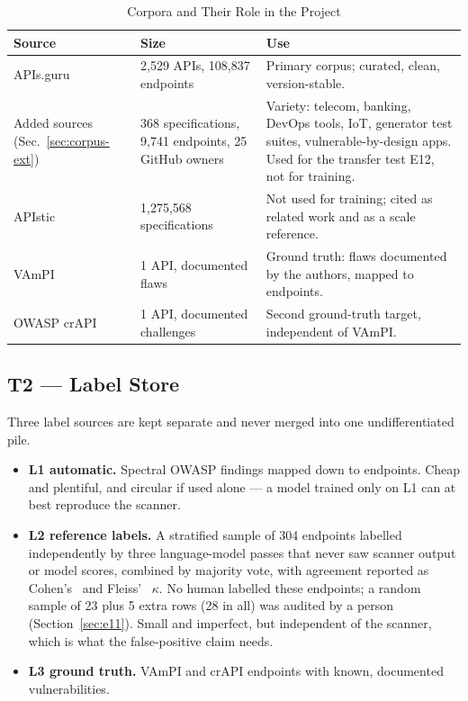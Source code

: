 \documentclass[conference]{IEEEtran}
\begin{document}
\begin{table}[!t]
\caption{Corpora and Their Role in the Project}
\label{tab:corpora}
\centering
\footnotesize
\begin{tabularx}{\columnwidth}{L{1.7cm} L{1.9cm} Y}
\toprule
\textbf{Source} & \textbf{Size} & \textbf{Use}\\
\midrule
APIs.guru~\cite{apisguru} & 2{,}529 APIs, 108{,}837 endpoints & Primary corpus; curated,
clean, version-stable.\\
Added sources (Sec.~\ref{sec:corpus-ext}) & 368 specifications, 9{,}741 endpoints, 25 GitHub owners & Variety: telecom, banking, DevOps tools, IoT, generator test suites, vulnerable-by-design apps. Used for the transfer test E12, not for training.\\
APIstic~\cite{apistic} & 1{,}275{,}568 specifications & Not used for training; cited as related work and as a scale reference.\\
VAmPI~\cite{vampi} & 1 API, documented flaws & Ground truth: flaws documented by the
authors, mapped to endpoints.\\
OWASP crAPI~\cite{crapi} & 1 API, documented challenges & Second ground-truth target,
independent of VAmPI.\\
\bottomrule
\end{tabularx}
\end{table}

\subsection{T2 --- Label Store}
Three label sources are kept separate and never merged into one undifferentiated pile.

\begin{itemize}
\item \textbf{L1 automatic.} Spectral OWASP findings mapped down to endpoints. Cheap and
plentiful, and circular if used alone --- a model trained only on L1 can at best reproduce
the scanner.
\item \textbf{L2 reference labels.} A stratified sample of 304 endpoints labelled independently
by three language-model passes that never saw scanner output or model scores, combined by
majority vote, with agreement reported as Cohen's~\cite{cohen} and Fleiss'~\cite{fleiss} $\kappa$. No human labelled
these endpoints; a random sample of 23 plus 5 extra rows (28 in all) was audited by a person (Section~\ref{sec:e11}). Small and imperfect, but independent of the scanner, which is what the
false-positive claim needs.
\item \textbf{L3 ground truth.} VAmPI and crAPI endpoints with known, documented
vulnerabilities.
\end{itemize}
\end{document}
